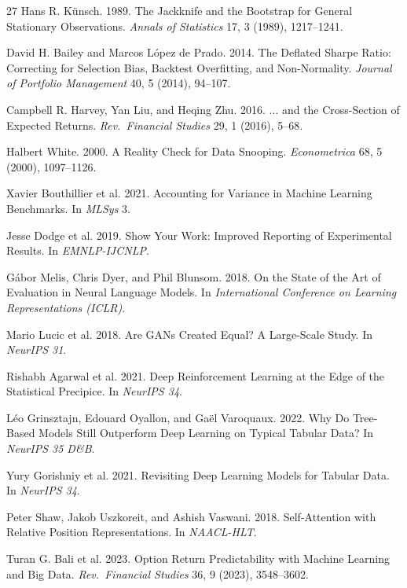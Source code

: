 \documentclass[sigconf,review]{acmart}
\begin{document}
\begin{thebibliography}{27}
Hans R. K\"unsch. 1989. The Jackknife and the Bootstrap for General Stationary Observations. \textit{Annals of Statistics} 17, 3 (1989), 1217--1241.

David H. Bailey and Marcos L\'opez de Prado. 2014. The Deflated Sharpe Ratio: Correcting for Selection Bias, Backtest Overfitting, and Non-Normality. \textit{Journal of Portfolio Management} 40, 5 (2014), 94--107.

Campbell R. Harvey, Yan Liu, and Heqing Zhu. 2016. $\ldots$ and the Cross-Section of Expected Returns. \textit{Rev.\ Financial Studies} 29, 1 (2016), 5--68.

Halbert White. 2000. A Reality Check for Data Snooping. \textit{Econometrica} 68, 5 (2000), 1097--1126.

Xavier Bouthillier et al. 2021. Accounting for Variance in Machine Learning Benchmarks. In \textit{MLSys} 3.

Jesse Dodge et al. 2019. Show Your Work: Improved Reporting of Experimental Results. In \textit{EMNLP-IJCNLP}.

G\'abor Melis, Chris Dyer, and Phil Blunsom. 2018. On the State of the Art of Evaluation in Neural Language Models. In \textit{International Conference on Learning Representations (ICLR)}.

Mario Lucic et al. 2018. Are GANs Created Equal? A Large-Scale Study. In \textit{NeurIPS 31}.

Rishabh Agarwal et al. 2021. Deep Reinforcement Learning at the Edge of the Statistical Precipice. In \textit{NeurIPS 34}.

L\'eo Grinsztajn, Edouard Oyallon, and Ga\"el Varoquaux. 2022. Why Do Tree-Based Models Still Outperform Deep Learning on Typical Tabular Data? In \textit{NeurIPS 35 D\&B}.

Yury Gorishniy et al. 2021. Revisiting Deep Learning Models for Tabular Data. In \textit{NeurIPS 34}.

Peter Shaw, Jakob Uszkoreit, and Ashish Vaswani. 2018. Self-Attention with Relative Position Representations. In \textit{NAACL-HLT}.

Turan G. Bali et al. 2023. Option Return Predictability with Machine Learning and Big Data. \textit{Rev.\ Financial Studies} 36, 9 (2023), 3548--3602.

\end{thebibliography}
\endgroup
\end{document}
